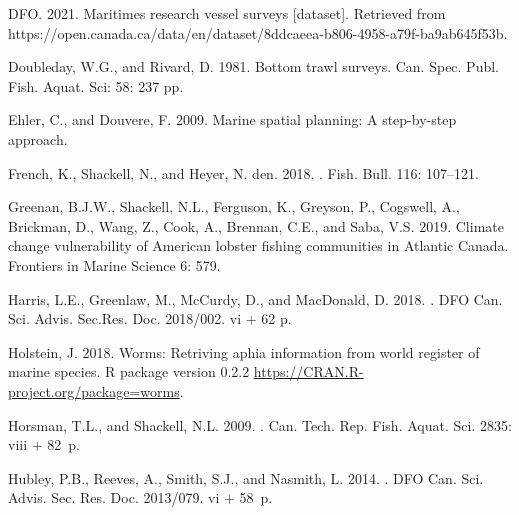 \documentclass[12pt]{article}\usepackage[]{graphicx}\usepackage[]{color}
\begin{document}
\begin{CSLReferences}{1}{0}
\leavevmode\hypertarget{ref-OpenData_MAR_RV}{}%
DFO. 2021. Maritimes research vessel surveys {[}dataset{]}. Retrieved from https://open.canada.ca/data/en/dataset/8ddcaeea-b806-4958-a79f-ba9ab645f53b.

\leavevmode\hypertarget{ref-DoubledayRivard1981}{}%
Doubleday, W.G., and Rivard, D. 1981. Bottom trawl surveys. Can. Spec. Publ. Fish. Aquat. Sci: 58: 237 pp.

\leavevmode\hypertarget{ref-Ehler:2009}{}%
Ehler, C., and Douvere, F. 2009. Marine spatial planning: A step-by-step approach.

\leavevmode\hypertarget{ref-French:2018}{}%
French, K., Shackell, N., and Heyer, N. den. 2018. . Fish. Bull. 116: 107--121.

\leavevmode\hypertarget{ref-Greenan:2019}{}%
Greenan, B.J.W., Shackell, N.L., Ferguson, K., Greyson, P., Cogswell, A., Brickman, D., Wang, Z., Cook, A., Brennan, C.E., and Saba, V.S. 2019. Climate change vulnerability of {A}merican lobster fishing communities in {A}tlantic {C}anada. Frontiers in Marine Science 6: 579.

\leavevmode\hypertarget{ref-Harris:2018}{}%
Harris, L.E., Greenlaw, M., McCurdy, D., and MacDonald, D. 2018. . DFO Can. Sci. Advis. Sec.Res. Doc. 2018/002. vi + 62 p.

\leavevmode\hypertarget{ref-R:package:worms}{}%
Holstein, J. 2018. Worms: Retriving aphia information from world register of marine species. R package version 0.2.2 \url{https://CRAN.R-project.org/package=worms}.

\leavevmode\hypertarget{ref-Horsman:atlas:2009}{}%
Horsman, T.L., and Shackell, N.L. 2009. . Can. Tech. Rep. Fish. Aquat. Sci. 2835: viii + 82~p.

\leavevmode\hypertarget{ref-Hubley2013}{}%
Hubley, P.B., Reeves, A., Smith, S.J., and Nasmith, L. 2014. . DFO Can. Sci. Advis. Sec. Res. Doc. 2013/079. vi + 58~p.


\end{CSLReferences}
\end{document}
